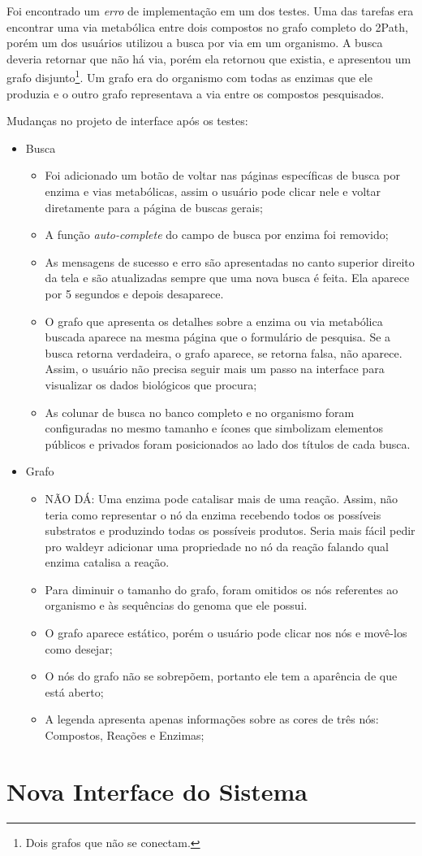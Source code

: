 Foi encontrado um \textit{erro} de implementação em um dos testes. Uma das tarefas era encontrar uma via metabólica entre dois compostos no grafo completo do 2Path, porém um dos usuários utilizou a busca por via em um organismo. A busca deveria retornar que não há via, porém ela retornou que existia, e apresentou um grafo disjunto\footnote{Dois grafos que não se conectam.}. Um grafo era do organismo com todas as enzimas que ele produzia e o outro grafo representava a via entre os compostos pesquisados.


Mudanças no projeto de interface após os testes:
\begin{itemize}
\item Busca
  \begin{itemize}
  \item[1] Foi adicionado um botão de voltar nas páginas específicas de busca por enzima e vias metabólicas, assim o usuário pode clicar nele e voltar diretamente para a página de buscas gerais;
  \item[2] A função \textit{auto-complete} do campo de busca por enzima foi removido;
  \item[3] As mensagens de sucesso e erro são apresentadas no canto superior direito da tela e são atualizadas sempre que uma nova busca é feita. Ela aparece por 5 segundos e depois desaparece.
  \item[4, 5] O grafo que apresenta os detalhes sobre a enzima ou via metabólica buscada aparece na mesma página que o formulário de pesquisa. Se a busca retorna verdadeira, o grafo aparece, se retorna falsa, não aparece. Assim, o usuário não precisa seguir mais um passo na interface para visualizar os dados biológicos que procura;
  \item[6] As colunar de busca no banco completo e no organismo foram configuradas no mesmo tamanho e ícones que simbolizam elementos públicos e privados foram posicionados ao lado dos títulos de cada busca.
  \end{itemize}
  
\item Grafo
  \begin{itemize} 
  \item[1] NÃO DÁ: Uma enzima pode catalisar mais de uma reação. Assim, não teria como representar o nó da enzima recebendo todos os possíveis substratos e produzindo todas os possíveis produtos. Seria mais fácil pedir pro waldeyr adicionar uma propriedade no nó da reação falando qual enzima catalisa a reação.
  \item[2, 3, 4] Para diminuir o tamanho do grafo, foram omitidos os nós referentes ao organismo e às sequências do genoma que ele possui.
  \item[5] O grafo aparece estático, porém o usuário pode clicar nos nós e movê-los como desejar;
  \item[6] O nós do grafo não se sobrepõem, portanto ele tem a aparência de que está aberto;
  \item[7] A legenda apresenta apenas informações sobre as cores de três nós: Compostos, Reações e Enzimas;
  \end{itemize}
\end{itemize}
 
 
 

\section{Nova Interface do Sistema}

